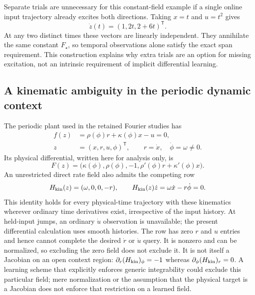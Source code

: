 \documentclass[journal]{IEEEtran}
\begin{document}
Separate trials are unnecessary for this constant-field example if a single
online input trajectory already excites both directions. Taking $x=t$ and
$u=t^2$ gives
\begin{equation}
 \dot z(t)=(1,2t,2+6t)^{\mathsf T}.
 \label{eq:tv_online_excitation}
\end{equation}
At any two distinct times these vectors are linearly independent. They
annihilate the same constant $F_\star$, so temporal observations alone
satisfy the exact span requirement. This construction explains why extra
trials are an option for missing excitation, not an intrinsic requirement
of implicit differential learning.

\subsection{A kinematic ambiguity in the periodic dynamic context}
The periodic plant used in the retained Fourier studies has
\begin{equation}
 \begin{aligned}
 f(z)&=\rho(\phi)r+\kappa(\phi)x-u=0,\\
 z&=(x,r,u,\phi)^{\mathsf T},\qquad
 r=\dot x,\quad\dot\phi=\omega\ne0.
 \end{aligned}
 \label{eq:tv_periodic_context}
\end{equation}
Its physical differential, written here for analysis only, is
\begin{equation}
 F(z)=\bigl(\kappa(\phi),\rho(\phi),-1,
                \rho'(\phi)r+\kappa'(\phi)x\bigr).
 \label{eq:tv_periodic_differential}
\end{equation}
An unrestricted direct rate field also admits the competing row
\begin{equation}
 H_{\rm kin}(z)=(\omega,0,0,-r),\qquad
 H_{\rm kin}(z)\dot z=\omega\dot x-r\dot\phi=0.
 \label{eq:tv_kinematic_competitor}
\end{equation}
This identity holds for every physical-time trajectory with these
kinematics wherever ordinary time derivatives exist, irrespective of the
input history. At held-input jumps, an ordinary $\dot u$ observation is
unavailable; the present differential calculation uses smooth histories.
The row has zero $r$ and $u$ entries and hence cannot complete the desired
$\dot r$ or $\dot u$ query.
It is nonzero and can be normalized, so excluding the zero field does not
exclude it. It is not itself a Jacobian on an open context region:
$\partial_r(H_{\rm kin})_\phi=-1$ whereas
$\partial_\phi(H_{\rm kin})_r=0$. A learning scheme that explicitly enforces
generic integrability could exclude this particular field; mere
normalization or the assumption that the physical target is a Jacobian
does not enforce that restriction on a learned field.
\end{document}
